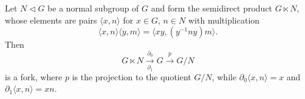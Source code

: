 Let $N \triangleleft G$ be a normal subgroup of $G$ and form the semidirect product $G \ltimes N$, whose elements are pairs $\langle x, n \rangle$ for $x \in G$, $n \in N$ with multiplication
$$\langle x, n \rangle \langle y, m \rangle = \langle xy, (y^{-1} n y) m \rangle.$$
Then
$$G \ltimes N \xrightarrow[\partial_1]{\partial_0} G \xrightarrow{p} G/N$$
is a fork, where $p$ is the projection to the quotient $G/N$, while $\partial_0 \langle x, n \rangle = x$ and $\partial_1 \langle x, n \rangle = x n$.
